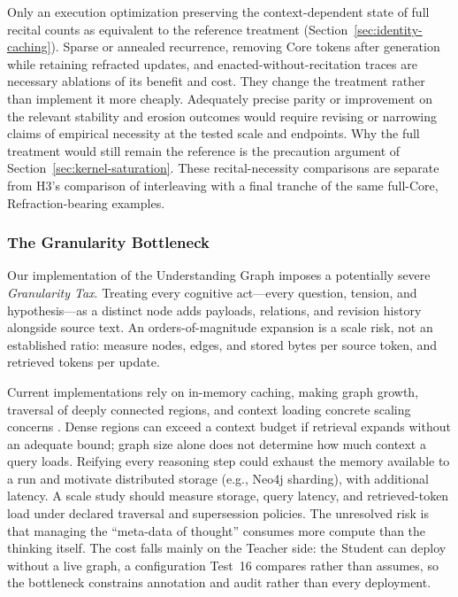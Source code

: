 \documentclass[11pt]{article}
\begin{document}
Only an execution optimization preserving the context-dependent state of full
recital counts as equivalent to the reference treatment
(Section~\ref{sec:identity-caching}). Sparse or annealed recurrence, removing
Core tokens after generation while retaining refracted updates, and
enacted-without-recitation traces are necessary ablations of its benefit and
cost. They change the treatment rather than implement it more cheaply.
Adequately precise parity or improvement on the relevant stability and erosion
outcomes would require revising or narrowing claims of empirical necessity at
the tested scale and endpoints. Why the full treatment would still remain the
reference is the precaution argument of Section~\ref{sec:kernel-saturation}.
These recital-necessity comparisons are separate
from H3's comparison of interleaving with a final tranche of the same full-Core,
Refraction-bearing examples.

\subsubsection{The Granularity Bottleneck}

Our implementation of the Understanding Graph imposes a potentially severe \emph{Granularity Tax}. Treating every cognitive act---every question, tension, and hypothesis---as a distinct node adds payloads, relations, and revision history alongside source text. An orders-of-magnitude expansion is a scale risk, not an established ratio: measure nodes, edges, and stored bytes per source token, and retrieved tokens per update.

Current implementations rely on in-memory caching, making graph growth, traversal of deeply connected regions, and context loading concrete scaling concerns \cite{westerberg2026understanding}. Dense regions can exceed a context budget if retrieval expands without an adequate bound; graph size alone does not determine how much context a query loads. Reifying every reasoning step could exhaust the memory available to a run and motivate distributed storage (e.g., Neo4j sharding), with additional latency. A scale study should measure storage, query latency, and retrieved-token load under declared traversal and supersession policies. The unresolved risk is that managing the ``meta-data of thought'' consumes more compute than the thinking itself. The cost falls mainly on the Teacher side: the Student can deploy without a live graph, a configuration Test~16 compares rather than assumes, so the bottleneck constrains annotation and audit rather than every deployment.
\end{document}
